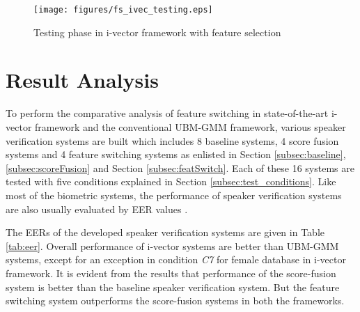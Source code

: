 \documentclass{article}
\begin{document}
	\begin{figure}[h!t]
	\texttt{[image: figures/fs\_ivec\_testing.eps]}
	\caption[blah]{Testing phase in i-vector framework with feature selection } 
	\label{fig:fs_ivec_test}
	\end{figure}

\section{Result Analysis}
\label{sec:resAnalysis}

To perform the comparative analysis of feature switching in state-of-the-art i-vector framework and the conventional UBM-GMM framework, various speaker verification systems are built which includes 8 baseline systems, 4 score fusion systems and 4 feature switching systems as enlisted in Section \ref{subsec:baseline}, \ref{subsec:scoreFusion} and Section \ref{subsec:featSwitch}. Each of these 16 systems are tested with five conditions explained in Section \ref{subsec:test_conditions}. Like most of the biometric systems, the performance of  speaker verification systems are also usually evaluated by EER values \cite{eer1}. 

\vspace{0.25cm}
The EERs of the developed speaker verification systems are given in Table \ref{tab:eer}. Overall performance of i-vector systems are better than UBM-GMM systems, except for an exception in condition {\it C7} for female database in i-vector framework. It is evident from the results that performance of the score-fusion system is better than the baseline speaker verification system. But the feature switching system outperforms the score-fusion systems in both the frameworks. 
\end{document}
